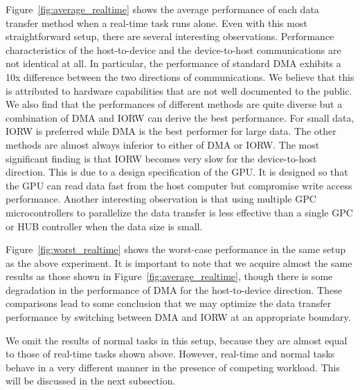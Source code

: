 Figure~\ref{fig:average_realtime} shows the average performance of each
data transfer method when a real-time task runs alone.
Even with this most straightforward setup, there are several interesting
observations.
Performance characteristics of the host-to-device and the device-to-host
communications are not identical at all.
In particular, the performance of standard DMA exhibits a 10x difference
between the two directions of communications.
We believe that this is attributed to hardware capabilities that are not
well documented to the public.
We also find that the performances of different methods are quite
diverse but a combination of \textsf{DMA} and \textsf{IORW} can derive
the best performance.
For small data, \textsf{IORW} is preferred while \textsf{DMA} is the
best performer for large data.
The other methods are almost always inferior to either of \textsf{DMA}
or \textsf{IORW}.
The most significant finding is that \textsf{IORW} becomes very slow for
the device-to-host direction.
This is due to a design specification of the GPU.
It is designed so that the GPU can read data fast from the host computer
but compromise write access performance.
Another interesting observation is that using multiple GPC
microcontrollers to parallelize the data transfer is less effective than
a single GPC or HUB controller when the data size is small.

Figure~\ref{fig:worst_realtime} shows the worst-case performance in
the same setup as the above experiment.
It is important to note that we acquire almost the same results as those
shown in Figure~\ref{fig:average_realtime}, though there is
some degradation in the performance of \textsf{DMA} for the
host-to-device direction.
These comparisons lead to some conclusion that we may optimize the data
transfer performance by switching between \textsf{DMA} and \textsf{IORW}
at an appropriate boundary.

We omit the results of normal tasks in this setup, because they are
almost equal to those of real-time tasks shown above.
However, real-time and normal tasks behave in a very different manner in
the presence of competing workload.
This will be discussed in the next subsection.

